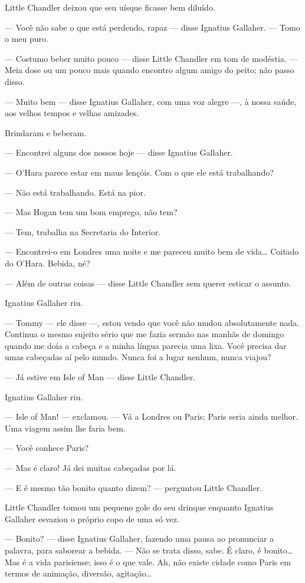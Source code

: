 Little Chandler deixou que seu uísque ficasse bem diluído.

--- Você não sabe o que está perdendo, rapaz --- disse Ignatius
Gallaher. --- Tomo o meu puro.

--- Costumo beber muito pouco --- disse Little Chandler em tom de
modéstia. --- Meia dose ou um pouco mais quando encontro algum amigo
do peito; não passo disso.

--- Muito bem --- disse Ignatius Gallaher, com uma voz alegre ---, à
nossa saúde, aos velhos tempos e velhas amizades.

Brindaram e beberam.

--- Encontrei alguns dos nossos hoje --- disse Ignatius Gallaher.

--- O'Hara parece estar em maus lençóis. Com o que ele está
trabalhando?

--- Não está trabalhando. Está na pior.

--- Mas Hogan tem um bom emprego, não tem?

--- Tem, trabalha na Secretaria do Interior.

--- Encontrei-o em Londres uma noite e me pareceu muito bem de vida\ldots{}
Coitado do O'Hara. Bebida, né?

--- Além de outras coisas --- disse Little Chandler sem querer esticar
o assunto.

Ignatius Gallaher riu.

--- Tommy --- ele disse ---, estou vendo que você não mudou
absolutamente nada. Continua o mesmo sujeito sério que me fazia
sermão nas manhãs de domingo quando me doía a cabeça e a minha
língua parecia uma lixa. Você precisa dar umas cabeçadas aí pelo
mundo. Nunca foi a lugar nenhum, nunca viajou?

--- Já estive em Isle of Man --- disse Little Chandler.

Ignatius Gallaher riu.

--- Isle of Man! --- exclamou. --- Vá a Londres ou Paris; Paris seria
ainda melhor. Uma viagem assim lhe faria bem.

--- Você conhece Paris?

--- Mas é claro! Já dei muitas cabeçadas por lá.

--- E é mesmo tão bonito quanto dizem? --- perguntou Little Chandler.

Little Chandler tomou um pequeno gole do seu drinque enquanto
Ignatius Gallaher esvaziou o próprio copo de uma só vez.

--- Bonito? --- disse Ignatius Gallaher, fazendo uma pausa ao
pronunciar a palavra, para saborear a bebida. --- Não se trata disso,
sabe. É claro, é bonito\ldots{} Mas é a vida parisiense; isso é o que vale.
Ah, não existe cidade como Paris em termos de animação, diversão,
agitação\ldots{}

